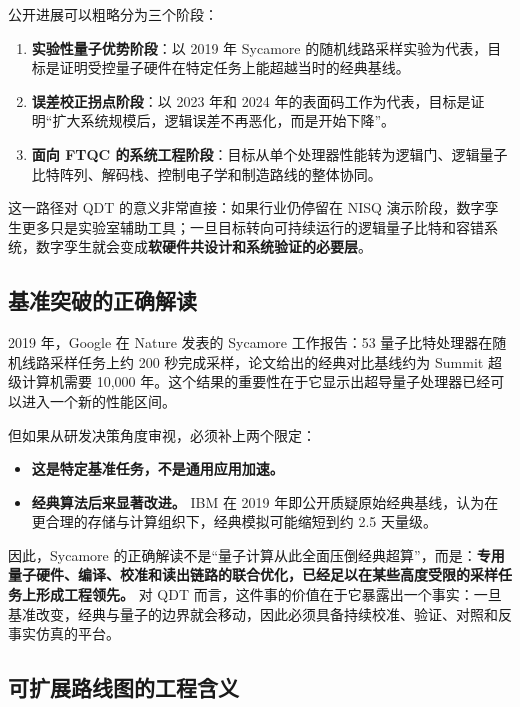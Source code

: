 \documentclass[11pt,a4paper]{article}
\newcommand{\QDT}{QDT}
\newcommand{\FTQC}{FTQC}
\begin{document}
公开进展可以粗略分为三个阶段：

\begin{enumerate}
  \item \textbf{实验性量子优势阶段}：以 2019 年 Sycamore 的随机线路采样实验为代表，目标是证明受控量子硬件在特定任务上能超越当时的经典基线。
  \item \textbf{误差校正拐点阶段}：以 2023 年和 2024 年的表面码工作为代表，目标是证明“扩大系统规模后，逻辑误差不再恶化，而是开始下降”。
  \item \textbf{面向 \FTQC{} 的系统工程阶段}：目标从单个处理器性能转为逻辑门、逻辑量子比特阵列、解码栈、控制电子学和制造路线的整体协同。
\end{enumerate}

这一路径对 \QDT{} 的意义非常直接：如果行业仍停留在 NISQ 演示阶段，数字孪生更多只是实验室辅助工具；一旦目标转向可持续运行的逻辑量子比特和容错系统，数字孪生就会变成\textbf{软硬件共设计和系统验证的必要层}。

\subsection{基准突破的正确解读}

2019 年，Google 在 Nature 发表的 Sycamore 工作报告：53 量子比特处理器在随机线路采样任务上约 200 秒完成采样，论文给出的经典对比基线约为 Summit 超级计算机需要 10,000 年。这个结果的重要性在于它显示出超导量子处理器已经可以进入一个新的性能区间。

但如果从研发决策角度审视，必须补上两个限定：

\begin{itemize}
  \item \textbf{这是特定基准任务，不是通用应用加速。}
  \item \textbf{经典算法后来显著改进。} IBM 在 2019 年即公开质疑原始经典基线，认为在更合理的存储与计算组织下，经典模拟可能缩短到约 2.5 天量级。
\end{itemize}

因此，Sycamore 的正确解读不是“量子计算从此全面压倒经典超算”，而是：\textbf{专用量子硬件、编译、校准和读出链路的联合优化，已经足以在某些高度受限的采样任务上形成工程领先。} 对 \QDT{} 而言，这件事的价值在于它暴露出一个事实：一旦基准改变，经典与量子的边界就会移动，因此必须具备持续校准、验证、对照和反事实仿真的平台。

\subsection{可扩展路线图的工程含义}
\end{document}
